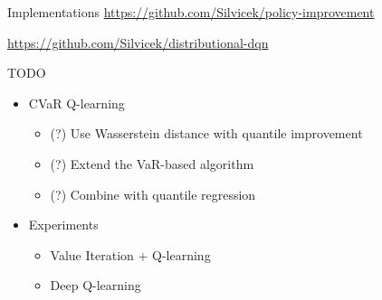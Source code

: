 \documentclass{beamer}
\begin{document}
\begin{frame}{Implementations}
\center
\url{https://github.com/Silvicek/policy-improvement}

\vspace{1cm}

\url{https://github.com/Silvicek/distributional-dqn}

\end{frame}

\begin{frame}{TODO}

\begin{itemize}
\item CVaR Q-learning
\begin{itemize}
\item (?) Use Wasserstein distance with quantile improvement
\item (?) Extend the VaR-based algorithm
\item (?) Combine with quantile regression
\end{itemize}

\item Experiments
\begin{itemize}
\item Value Iteration + Q-learning
\item Deep Q-learning
\end{itemize}



\end{itemize}



\end{frame}

\end{document}
